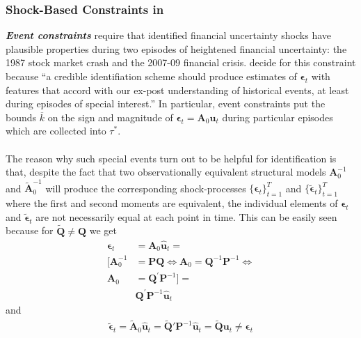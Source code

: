 \documentclass[a4paper,11pt,listof=nochaptergap,oneside,pointednumbers,bibtotoc,bigheadings,liststotoc]{scrbook}
\theoremstyle{mysatz}
\theoremstyle{mydefinition}
\theoremstyle{mybemerkung}
\renewcommand*{\paragraph}[1]{\subsubsection*{#1} \vspace{-3mm}} %
\let\oldhat\hat
\newcommand{\vect}[1]{\boldsymbol{\mathbf{#1}}}
\newcommand{\hatt}[1]{\oldhat{\boldsymbol{\mathbf{#1}}}}
\begin{document}
\begin{itemize}
\paragraph{Shock-Based Constraints in \citet{ludvigsonetal:18}}
\textbf{\textit{Event constraints}} require that identified financial uncertainty shocks have plausible properties during two episodes of heightened financial uncertainty: the 1987 stock market crash and the 2007-09 financial crisis. \citet{ludvigsonetal:18} decide for this constraint because ``a credible identifiation scheme should produce estimates of $\vect{\epsilon}_t$ with features that accord with our ex-post understanding of historical events, at least during episodes of special interest.'' \citep[p. 7]{ludvigsonetal:18}  In particular, event constraints put the bounds $\overline{k}$ on the sign and magnitude of $\vect{\epsilon}_t = \vect{A}_0\vect{u}_t$ during particular episodes which are collected into $\tau^*$. \\
\\
The reason why such special events turn out to be helpful for identification is that, despite the fact that two observationally equivalent structural models $\vect{A}_0^{-1}$ and $\widetilde{\vect{A}}_0^{-1}$ will produce the corresponding shock-processes $\big\{\vect{\epsilon}_t\big\}_{t=1}^T$ and $\big\{\widetilde{\vect{\epsilon}}_t\big\}_{t=1}^T$ where the first and second moments are equivalent, the individual elements of $\vect{\epsilon}_t$ and $\widetilde{\vect{\epsilon}}_t$ are not necessarily equal at each point in time. This can be easily seen because for $\widetilde{\vect{Q}} \neq \vect{Q}$ we get 
\begin{equation} \label{eq:svar_ludvi9}
\begin{split}
\vect{\epsilon}_t & = \vect{A}_0\hatt{\vect{u}}_t = \\
[\vect{A}_0^{-1} & = \vect{P}\vect{Q} \iff \vect{A}_0 = \vect{Q}^{-1}\vect{P}^{-1} \iff \\
\vect{A}_0 & = \vect{Q}^{'}\vect{P}^{-1}] = \\
	& \vect{Q}^'\vect{P}^{-1}\hatt{\vect{u}}_t 
\end{split}								
\end{equation}
and 
\begin{equation} \label{eq:svar_ludvi10}
\begin{split}
\widetilde{\vect{\epsilon}}_t = \widetilde{\vect{A}}_0\hatt{\vect{u}}_t = \widetilde{\vect{Q}}'\vect{P}^{-1}\hatt{\vect{u}}_t = \widetilde{\vect{Q}}\vect{u}_t \neq \vect{\epsilon}_t
\end{split}								

\end{equation}
\end{itemize}
\end{document}
